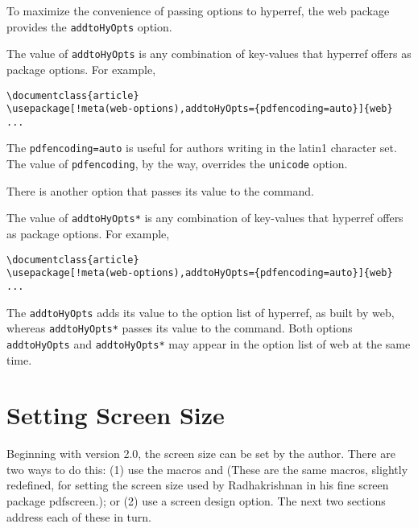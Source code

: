 \documentclass{article}
\def\meta#1{\textit{\texttt{#1}}}
\let\pkg\textsf
\let\opt\texttt
\edef\amtIndent{\the\parindent}
\def\darg#1{\{#1\}}
\begin{document}
{To maximize the convenience of passing options to \pkg{hyperref}, the \pkg{web} package
provides the \opt{addtoHyOpts} option.
\bVerb\takeMeasure{\string\usepackage[\meta{web-options},addtoHyOpts=\darg{\meta{Hy-options}}]\darg{web}}%
\eVerb The value of \opt{addtoHyOpts} is any combination of key-values that
\pkg{hyperref} offers as package options. For example,
\begin{Verbatim}[xleftmargin=\amtIndent,commandchars=!()]
\documentclass{article}
\usepackage[!meta(web-options),addtoHyOpts={pdfencoding=auto}]{web}
...
\end{Verbatim}
The \texttt{pdfencoding=auto} is useful for authors writing in the latin1 character set. The
value of \texttt{pdfencoding}, by the way, overrides the \opt{unicode} option.

There is another option that passes its value to the  command.
\bVerb\takeMeasure{\string\usepackage[\meta{web-options},addtoHyOpts*=\darg{\meta{Hy-options}}]\darg{web}}%
\eVerb The value of \opt{addtoHyOpts*} is any combination of key-values that
\pkg{hyperref} offers as package options. For example,
\begin{Verbatim}[xleftmargin=\amtIndent,commandchars=!()]
\documentclass{article}
\usepackage[!meta(web-options),addtoHyOpts={pdfencoding=auto}]{web}
...
\end{Verbatim}

The \opt{addtoHyOpts} adds its value to the option list of \pkg{hyperref}, as
built by \pkg{web}, whereas \opt{addtoHyOpts*} passes its value to the
 command. Both options \opt{addtoHyOpts} and
\opt{addtoHyOpts*} may appear in the option list of \pkg{web} at the same
time.

\section{Setting Screen Size}\label{s:setscreensize}

Beginning with version 2.0, the screen size can be set by the
author. There are two ways to do this: (1) use the macros
 and  (These are the same
macros, slightly redefined, for setting the screen size used by
Radhakrishnan in his fine screen package \textsf{pdfscreen}.); or (2) use
a screen design option. The next two sections address each of
these in turn.

}
\end{document}
